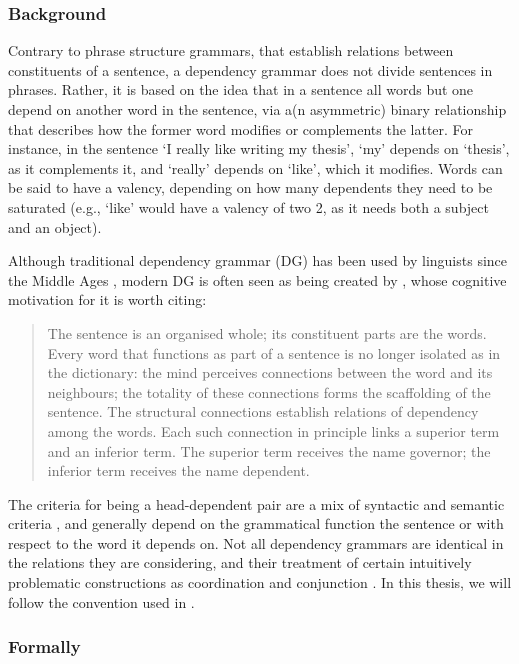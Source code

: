 \documentclass{report}
\theoremstyle{definition}
\theoremstyle{plain}
\begin{document}
\subsubsection{Background}

Contrary to phrase structure grammars, that establish relations between constituents of a sentence, a dependency grammar does not divide sentences in phrases. Rather, it is based on the idea that in a sentence all words but one depend on another word in the sentence, via a(n asymmetric) binary relationship that describes how the former word modifies or complements the latter. For instance, in the sentence `I really like writing my thesis', `my' depends on `thesis', as it complements it, and `really' depends on `like', which it modifies. Words can be said to have a valency, depending on how many dependents they need to be saturated (e.g., `like' would have a valency of two 2, as it needs both a subject and an object).

Although traditional dependency grammar (DG) has been used by linguists since the Middle Ages \citep{covington1990dependency}, modern DG is often seen as being created by \cite{tesniere1959elements}, whose cognitive motivation for it is worth citing:

\begin{quote}
The sentence is an organised whole; its constituent parts are the words. Every word that functions as part of a sentence is no longer isolated as in the dictionary: the mind perceives connections between the word and its neighbours; the totality of these connections forms the scaffolding of the sentence. The structural connections establish relations of dependency among the words. Each such connection in principle links a superior term and an inferior term. The superior term receives the name governor; the inferior term receives the name dependent. \citep[Translation:][]{ryan2013}
\end{quote}

The criteria for being a head-dependent pair are a mix of syntactic and semantic criteria \citep{nivre2005dependency}, and generally depend on the grammatical function the sentence or with respect to the word it depends on. Not all dependency grammars are identical in the relations they are considering, and their treatment of certain intuitively problematic constructions as coordination and conjunction \citep{nivre2005dependency}. In this thesis, we will follow the convention used in \cite{de2006generating}.

\subsubsection{Formally}
\end{document}
